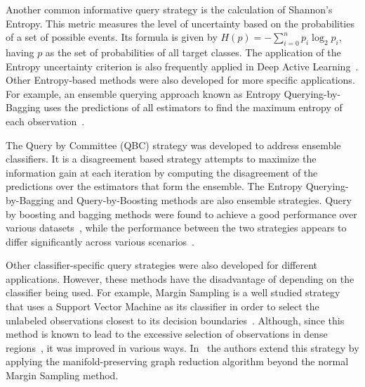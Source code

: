 Another common informative query strategy is the calculation of Shannon's
Entropy. This metric measures the level of uncertainty
based on the probabilities of a set of possible events. Its formula is given
by $H(p)=-\sum_{i=0}^n{p_i\log_2{p_i}}$, having $p$ as the set of
probabilities of all target classes. The application of the Entropy
uncertainty criterion is also frequently applied in Deep Active
Learning~\cite{Aghdam2019}. Other Entropy-based methods were also developed
for more specific applications. For example, an ensemble querying approach
known as Entropy Querying-by-Bagging uses the predictions of all estimators to
find the maximum entropy of each observation~\cite{Abe1998}.

The Query by Committee (QBC) strategy was developed to address ensemble
classifiers. It is a disagreement based strategy attempts to maximize the
information gain at each iteration by computing the disagreement of the
predictions over the estimators that form the ensemble. The Entropy
Querying-by-Bagging and Query-by-Boosting methods are also ensemble
strategies. Query by boosting and bagging methods were found to achieve a good
performance over various datasets~\cite{Melville2004}, while the performance
between the two strategies appears to differ significantly across various
scenarios~\cite{Bloodgood2018}.

Other classifier-specific query strategies were also developed for different
applications. However, these methods have the disadvantage of depending on the
classifier being used. For example, Margin Sampling is a well studied strategy
that uses a Support Vector Machine as its classifier in order to select the
unlabeled observations closest to its decision boundaries~\cite{Kumar2020}.
Although, since this method is known to lead to the excessive selection of
observations in dense regions~\cite{Zhou2014}, it was improved in various
ways. In~\cite{Zhou2014} the authors extend this strategy by applying the
manifold-preserving graph reduction algorithm beyond the normal Margin
Sampling method.

























